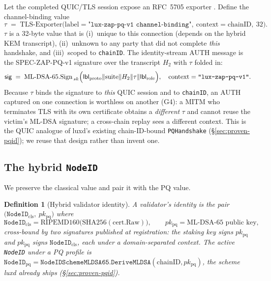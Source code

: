 \documentclass[11pt,a4paper]{article}
\newcommand{\msg}[1]{\textsf{#1}}
\newcommand{\code}[1]{\texttt{#1}}
\newtheorem{definition}{Definition}
\begin{document}
Let the completed QUIC/TLS session expose an RFC~5705 exporter
\cite{rfc5705}. Define the channel-binding value
\[
  \tau \;=\; \mathrm{TLS\text{-}Exporter}\bigl(\text{label}=\code{"lux-zap-pq-v1 channel-binding"},\ \text{context}=\text{chainID},\ 32\bigr).
\]
$\tau$ is a 32-byte value that is (i)~unique to this connection (depends
on the hybrid KEM transcript), (ii)~unknown to any party that did not
complete \emph{this} handshake, and (iii)~scoped to \code{chainID}. The
identity-stream \msg{AUTH} message is the SPEC-ZAP-PQ-v1 signature over
the transcript $H_2$ with $\tau$ folded in:
\[
  \mathsf{sig} \;=\; \mathrm{ML\text{-}DSA\text{-}65.Sign}_{\,sk}\Bigl(
     \mathsf{lbl}_{\text{proto}} \Vert \text{suite} \Vert H_2 \Vert \tau \Vert \mathsf{lbl}_{\text{role}}
  \Bigr),\quad \text{context}=\code{"lux-zap-pq-v1"}.
\]
Because $\tau$ binds the signature to \emph{this} QUIC session and to
\code{chainID}, an \msg{AUTH} captured on one connection is worthless on
another (G4): a MITM who terminates TLS with its own certificate obtains
a \emph{different} $\tau$ and cannot reuse the victim's ML-DSA signature;
a cross-chain replay sees a different context. This is the QUIC analogue
of luxd's existing chain-ID-bound \code{PQHandshake}
(\S\ref{sec:proven-pqid}); we reuse that design rather than invent one.

\subsection{The hybrid \texttt{NodeID}}\label{sec:nodeid}

We preserve the classical value and pair it with the PQ value.

\begin{definition}[Hybrid validator identity]\label{def:hybrid}
A validator's identity is the pair
$\bigl(\code{NodeID}_{\mathrm{cls}},\ pk_{\mathrm{pq}}\bigr)$ where
\[
  \code{NodeID}_{\mathrm{cls}} = \mathrm{RIPEMD160}\bigl(\mathrm{SHA256}(\text{cert}.\mathrm{Raw})\bigr),
  \qquad
  pk_{\mathrm{pq}} = \text{ML-DSA-65 public key},
\]
cross-bound by two signatures published at registration: the staking
key signs $pk_{\mathrm{pq}}$ and $pk_{\mathrm{pq}}$ signs
$\code{NodeID}_{\mathrm{cls}}$, each under a domain-separated context.
The active \code{NodeID} under a PQ profile is
$\code{NodeID}_{\mathrm{pq}} = \code{NodeIDSchemeMLDSA65.DeriveMLDSA}(\text{chainID}, pk_{\mathrm{pq}})$,
the scheme luxd already ships (\S\ref{sec:proven-pqid}).
\end{definition}
\end{document}
